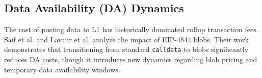 \subsection{Data Availability (DA) Dynamics}
The cost of posting data to L1 has historically dominated rollup transaction fees. Saif et al. \citet{saif2024dataavailability} and Lavaur et al. \citet{lavaur2023modular} analyze the impact of EIP-4844 blobs. Their work demonstrates that transitioning from standard \texttt{calldata} to blobs significantly reduces DA costs, though it introduces new dynamics regarding blob pricing and temporary data availability windows.